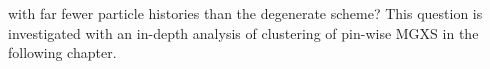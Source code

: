 \noindent with far fewer particle histories than the degenerate scheme? This question is investigated with an in-depth analysis of clustering of pin-wise \ac{MGXS} in the following chapter.



\clearpage


